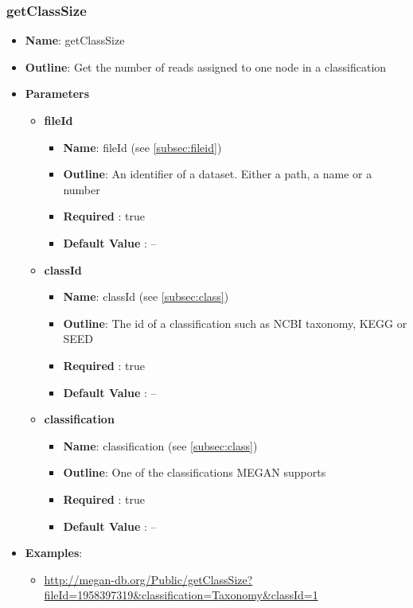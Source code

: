 \documentclass[11pt]{article}
\begin{document}
\subsubsection{getClassSize}
\begin{itemize}
	\item \textbf{Name}: getClassSize
	\item \textbf{Outline}: Get the number of reads assigned to one node in a classification
	\item \textbf{Parameters}
		\begin{itemize}
			\item \textbf{fileId}
				\begin{itemize}
					\item \textbf{Name}: fileId (see \ref{subsec:fileid})
					\item \textbf{Outline}: An identifier of a dataset. Either a path, a name or a number
					\item \textbf{Required} : true
					\item \textbf{Default Value} : --
				\end{itemize}
			\item \textbf{classId}
				\begin{itemize}
					\item \textbf{Name}: classId (see \ref{subsec:class})
					\item \textbf{Outline}: The id of a classification such as NCBI taxonomy, KEGG or SEED
					\item \textbf{Required} : true
					\item \textbf{Default Value} : --
				\end{itemize}
			\item \textbf{classification}
				\begin{itemize}
					\item \textbf{Name}: classification (see \ref{subsec:class})
					\item \textbf{Outline}: One of the classifications MEGAN supports
					\item \textbf{Required} : true
					\item \textbf{Default Value} : --
				\end{itemize}
		\end{itemize}
	\item \textbf{Examples}:
		\begin{itemize}
			\item \url{http://megan-db.org/Public/getClassSize?fileId=1958397319&classification=Taxonomy&classId=1}
		\end{itemize}
\end{itemize}
\end{document}

